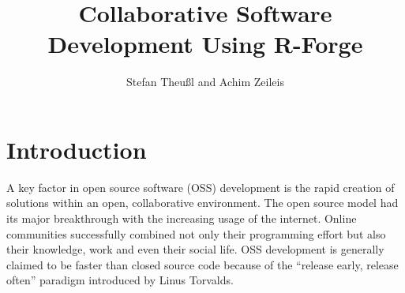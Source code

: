 \title{Collaborative Software Development Using R-Forge}
\author{Stefan Theu\ss{}l and Achim Zeileis}

\maketitle




\section*{Introduction}


A key factor in open source software (OSS) development is the rapid creation
of solutions within an open, collaborative environment. The open
source model had its major breakthrough with the increasing
usage of the internet. Online communities successfully combined
not only their programming effort but also their knowledge, work
and even their social life. OSS development is generally
claimed to be faster than closed source code because of the
``release early, release often'' paradigm introduced by Linus
Torvalds.


